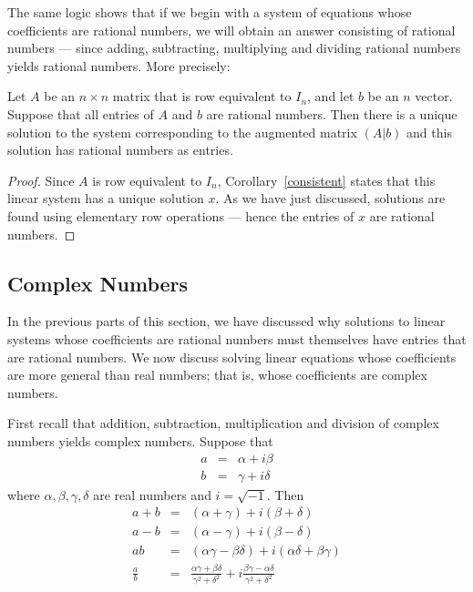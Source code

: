 \documentclass{ximera}
\begin{document}
The same logic shows that if we begin with a system of equations
whose coefficients are rational numbers, we will obtain an
answer consisting of rational numbers --- since adding,
subtracting, multiplying and dividing rational numbers yields
rational numbers. More precisely:
\begin{thm}
Let $A$ be an $n\times n$ matrix that is row equivalent to
$I_n$, and let $b$ be an $n$ vector.  Suppose that all entries of
$A$ and $b$ are rational numbers.  Then there is a unique
solution to the system corresponding to the augmented matrix
$(A|b)$ and this solution has rational numbers as entries.
\end{thm}

\begin{proof} Since $A$ is row equivalent to $I_n$,
Corollary~\ref{consistent} states that this linear system
has a unique solution $x$.  As we have just discussed, solutions
are found using elementary row operations --- hence the entries
of $x$ are rational numbers.  \end{proof}


\subsection*{Complex Numbers} 

In the previous parts of this section, we have discussed why
solutions to linear systems whose coefficients are rational
numbers must themselves have entries that are rational numbers.
We now discuss solving linear equations whose coefficients are
more general than real numbers; that is, whose coefficients are
complex numbers.

First recall that addition, subtraction, multiplication and
division of complex numbers yields complex numbers.  Suppose
that
\begin{eqnarray*}
a & = & \alpha + i\beta \\
b & = & \gamma + i\delta
\end{eqnarray*}
where $\alpha,\beta,\gamma,\delta$ are real numbers and
$i=\sqrt{-1}$. Then
\begin{eqnarray*}
a+b & = & (\alpha+\gamma) + i(\beta+\delta) \\
a-b & = & (\alpha-\gamma) + i(\beta-\delta) \\
ab & = &
(\alpha\gamma-\beta\delta)+i(\alpha\delta+\beta\gamma)\\
\frac{a}{b} & = & \frac{\alpha\gamma+\beta\delta}{\gamma^2+\delta^2}+
i\frac{\beta\gamma-\alpha\delta}{\gamma^2+\delta^2}
\end{eqnarray*}
\end{document}
